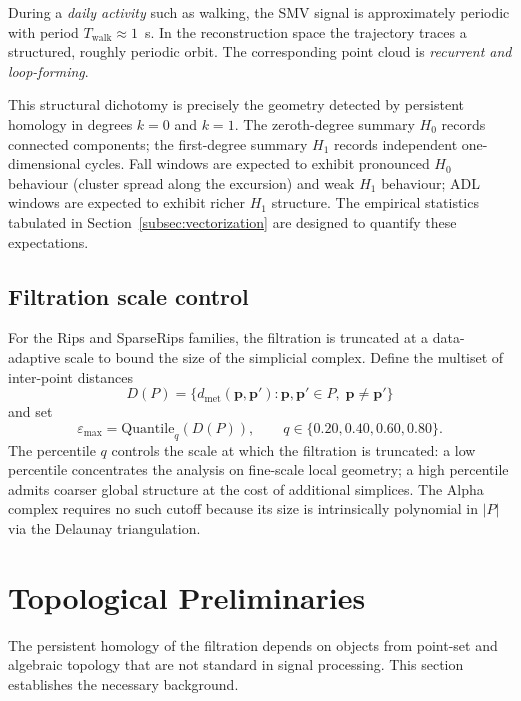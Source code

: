 During a \emph{daily activity} such as walking, the SMV signal is approximately periodic with period $T_{\mathrm{walk}}\approx 1$~s. In the reconstruction space the trajectory traces a structured, roughly periodic orbit. The corresponding point cloud is \emph{recurrent and loop-forming}.

This structural dichotomy is precisely the geometry detected by persistent homology in degrees $k=0$ and $k=1$. The zeroth-degree summary $H_0$ records connected components; the first-degree summary $H_1$ records independent one-dimensional cycles. Fall windows are expected to exhibit pronounced $H_0$ behaviour (cluster spread along the excursion) and weak $H_1$ behaviour; ADL windows are expected to exhibit richer $H_1$ structure. The empirical statistics tabulated in Section~\ref{subsec:vectorization} are designed to quantify these expectations.

\subsection{Filtration scale control}
\label{subsubsec:eps}

For the Rips and SparseRips families, the filtration is truncated at a data-adaptive scale to bound the size of the simplicial complex. Define the multiset of inter-point distances
\[
  D(P)=\bigl\{d_{\mathrm{met}}(\mathbf{p},\mathbf{p}'):\mathbf{p},\mathbf{p}'\in P,\;\mathbf{p}\neq\mathbf{p}'\bigr\}
\]
and set
\begin{equation}
  \varepsilon_{\max}=\mathrm{Quantile}_q(D(P)),
  \qquad
  q\in\{0.20,0.40,0.60,0.80\}.
  \label{eq:eps_max}
\end{equation}
The percentile $q$ controls the scale at which the filtration is truncated: a low percentile concentrates the analysis on fine-scale local geometry; a high percentile admits coarser global structure at the cost of additional simplices. The Alpha complex requires no such cutoff because its size is intrinsically polynomial in $|P|$ via the Delaunay triangulation.

\section{Topological Preliminaries}
\label{subsec:topological_prelim}

The persistent homology of the filtration depends on objects from point-set and algebraic topology that are not standard in signal processing. This section establishes the necessary background.

